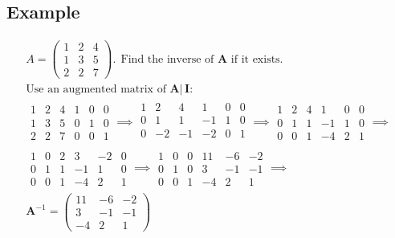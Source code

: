 \documentclass[a4paper, 11pt, normalem]{report}
\begin{document}
\subsection{Example}
\begin{gather*}
    A =
    \begin{pmatrix}
        1 & 2 & 4 \\
        1 & 3 & 5 \\
        2 & 2 & 7
    \end{pmatrix}. ~~
    \text{Find the inverse of }\mathbf{A} \text{ if it exists.} \\
    \text{Use an augmented matrix of }\mathbf{A|\,I}: \\
    \begin{array}{ccc|ccc}
        1 & 2 & 4 & 1 & 0 & 0 \\
        1 & 3 & 5 & 0 & 1 & 0 \\
        2 & 2 & 7 & 0 & 0 & 1
    \end{array} \implies
    \begin{array}{ccc|ccc}
        1 &  2 &  4 &  1 & 0 & 0 \\
        0 &  1 &  1 & -1 & 1 & 0 \\
        0 & -2 & -1 & -2 & 0 & 1 \\
    \end{array} \implies
    \begin{array}{ccc|ccc}
        1 & 2 & 4 &  1 & 0 & 0 \\
        0 & 1 & 1 & -1 & 1 & 0 \\
        0 & 0 & 1 & -4 & 2 & 1
    \end{array} \implies \\
    \begin{array}{ccc|ccc}
        1 & 0 & 2 &  3 & -2 & 0 \\
        0 & 1 & 1 & -1 &  1 & 0 \\
        0 & 0 & 1 & -4 &  2 & 1
    \end{array} \implies
    \begin{array}{ccc|ccc}
        1 & 0 & 0 & 11 & -6 & -2 \\
        0 & 1 & 0 &  3 & -1 & -1 \\
        0 & 0 & 1 & -4 &  2 &  1
    \end{array} \implies \\
    \mathbf{A}^{-1} =
    \begin{pmatrix}
        11 & -6 & -2 \\
         3 & -1 & -1 \\
        -4 &  2 &  1
    \end{pmatrix}
\end{gather*}
\end{document}
